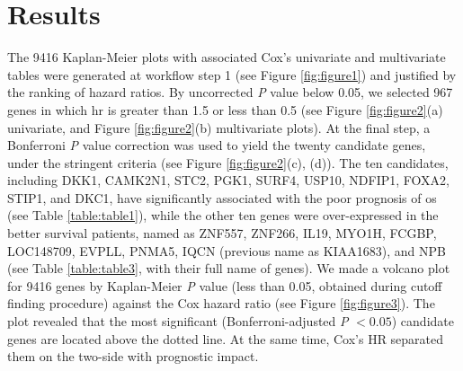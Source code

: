 \documentclass[jpm,article,submit,moreauthors,pdftex]{Definitions/mdpi}
\begin{document}
\clearpage

\section{Results}


The 9416 Kaplan-Meier plots with associated Cox's univariate and multivariate tables were generated at workflow step 1 (see Figure \ref{fig:figure1}) and justified by the ranking of hazard ratios.
By uncorrected \textit{P} value below 0.05, we selected 967 genes in which \acrfull{hr} is greater than 1.5 or less than 0.5 (see Figure \ref{fig:figure2}(a) univariate, and Figure \ref{fig:figure2}(b)  multivariate plots). At the final step, a Bonferroni \textit{P} value correction was used to yield the twenty candidate genes, under the stringent criteria (see Figure \ref{fig:figure2}(c), (d)). The ten candidates, including DKK1, CAMK2N1, STC2, PGK1, SURF4, USP10, NDFIP1, FOXA2, STIP1, and DKC1, have significantly associated with the poor prognosis of \acrshort{os} (see Table \ref{table:table1}),
while the other ten genes were over-expressed in the better survival patients, named as ZNF557, ZNF266, IL19, MYO1H, FCGBP, LOC148709, EVPLL, PNMA5, IQCN (previous name as KIAA1683), and NPB (see Table \ref{table:table3}, with their full name of genes).
We made a volcano plot for 9416 genes by Kaplan-Meier \textit{P} value (less than 0.05, obtained during cutoff finding procedure) against the Cox hazard ratio (see Figure \ref{fig:figure3}). The plot revealed that the most significant (Bonferroni-adjusted \textit{P} $< 0.05$) candidate genes are located above the dotted line. At the same time, Cox's HR separated them on the two-side with prognostic impact.
\end{document}
